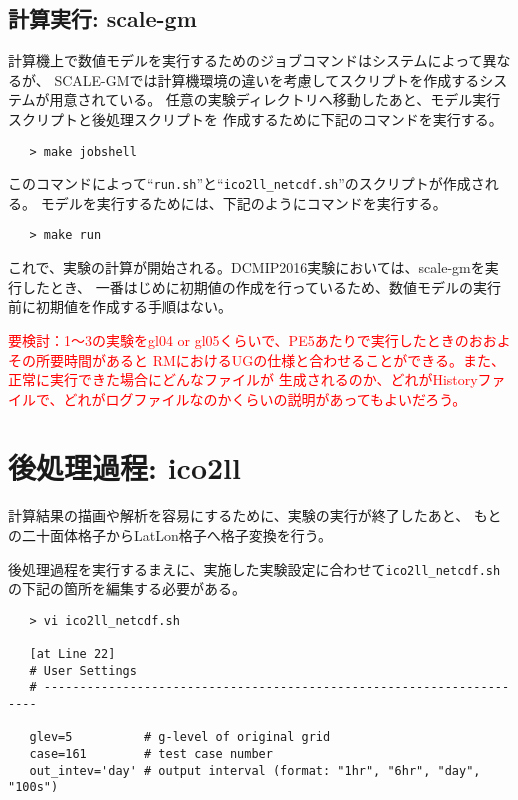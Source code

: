 \subsection{計算実行: scale-gm}

計算機上で数値モデルを実行するためのジョブコマンドはシステムによって異なるが、
SCALE-GMでは計算機環境の違いを考慮してスクリプトを作成するシステムが用意されている。
任意の実験ディレクトリへ移動したあと、モデル実行スクリプトと後処理スクリプトを
作成するために下記のコマンドを実行する。

 \begin{verbatim}
   > make jobshell
 \end{verbatim}

このコマンドによって``\verb|run.sh|''と``\verb|ico2ll_netcdf.sh|''のスクリプトが作成される。
モデルを実行するためには、下記のようにコマンドを実行する。

 \begin{verbatim}
   > make run
 \end{verbatim}

これで、実験の計算が開始される。DCMIP2016実験においては、scale-gmを実行したとき、
一番はじめに初期値の作成を行っているため、数値モデルの実行前に初期値を作成する手順はない。

\textcolor{red}{要検討：1〜3の実験をgl04 or gl05くらいで、PE5あたりで実行したときのおおよその所要時間があると
 RMにおけるUGの仕様と合わせることができる。また、正常に実行できた場合にどんなファイルが
 生成されるのか、どれがHistoryファイルで、どれがログファイルなのかくらいの説明があってもよいだろう。}


\section{後処理過程: ico2ll}
計算結果の描画や解析を容易にするために、実験の実行が終了したあと、
もとの二十面体格子からLatLon格子へ格子変換を行う。

後処理過程を実行するまえに、実施した実験設定に合わせて\verb|ico2ll_netcdf.sh|
の下記の箇所を編集する必要がある。
 \begin{verbatim}
   > vi ico2ll_netcdf.sh

   [at Line 22]
   # User Settings
   # ---------------------------------------------------------------------

   glev=5          # g-level of original grid
   case=161        # test case number
   out_intev='day' # output interval (format: "1hr", "6hr", "day", "100s")
 \end{verbatim}

